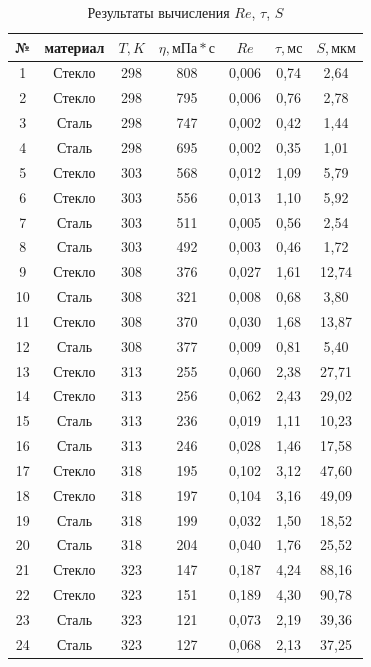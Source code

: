 \documentclass[a4paper, 12pt]{article}
\begin{document}
    \begin{table}[!ht]
        \centering
        \begin{tabular}{|c|c|c|c|c|c|c|}
            \hline
            № & материал & $T, K$ & $\eta, мПа * с$ & $Re$ & $\tau, мс$ & $S, мкм$ \\ \hline
            1 & Стекло & 298 & 808 & 0,006 & 0,74 & 2,64  \\ \hline
            2 & Стекло & 298 & 795 & 0,006 & 0,76 & 2,78  \\ \hline
            3 & Сталь & 298 & 747 & 0,002 & 0,42 & 1,44  \\ \hline
            4 & Сталь & 298 & 695 & 0,002 & 0,35 & 1,01  \\ \hline
            5 & Стекло & 303 & 568 & 0,012 & 1,09 & 5,79  \\ \hline
            6 & Стекло & 303 & 556 & 0,013 & 1,10 & 5,92  \\ \hline
            7 & Сталь & 303 & 511 & 0,005 & 0,56 & 2,54  \\ \hline
            8 & Сталь & 303 & 492 & 0,003 & 0,46 & 1,72  \\ \hline
            9 & Стекло & 308 & 376 & 0,027 & 1,61 & 12,74  \\ \hline
            10 & Сталь & 308 & 321 & 0,008 & 0,68 & 3,80  \\ \hline
            11 & Стекло & 308 & 370 & 0,030 & 1,68 & 13,87  \\ \hline
            12 & Сталь & 308 & 377 & 0,009 & 0,81 & 5,40  \\ \hline
            13 & Стекло & 313 & 255 & 0,060 & 2,38 & 27,71  \\ \hline
            14 & Стекло & 313 & 256 & 0,062 & 2,43 & 29,02  \\ \hline
            15 & Сталь & 313 & 236 & 0,019 & 1,11 & 10,23  \\ \hline
            16 & Сталь & 313 & 246 & 0,028 & 1,46 & 17,58  \\ \hline
            17 & Стекло & 318 & 195 & 0,102 & 3,12 & 47,60  \\ \hline
            18 & Стекло & 318 & 197 & 0,104 & 3,16 & 49,09  \\ \hline
            19 & Сталь & 318 & 199 & 0,032 & 1,50 & 18,52  \\ \hline
            20 & Сталь & 318 & 204 & 0,040 & 1,76 & 25,52  \\ \hline
            21 & Стекло & 323 & 147 & 0,187 & 4,24 & 88,16  \\ \hline
            22 & Стекло & 323 & 151 & 0,189 & 4,30 & 90,78  \\ \hline
            23 & Сталь & 323 & 121 & 0,073 & 2,19 & 39,36  \\ \hline
            24 & Сталь & 323 & 127 & 0,068 & 2,13 & 37,25  \\ \hline
        \end{tabular}
        \caption{Результаты вычисления $Re$, $\tau$, $S$}
        \label{re_tau_s}
    \end{table}
\end{document}
